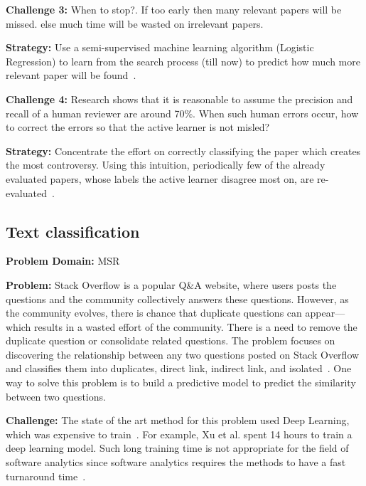 \documentclass[sigconf,anonymous,review]{acmart}
\begin{document}
\vspace{1.0ex}
\noindent\textbf{Challenge 3: }
When to stop?. If too early then   many   relevant papers will be missed.
else much time will be wasted on irrelevant papers. 

\noindent\textbf{Strategy: }
Use a semi-supervised machine learning algorithm (Logistic Regression) to learn from the search process (till now) to predict how much more relevant paper will be found~\cite{YuM17}. 

\vspace{1.0ex}
\noindent\textbf{Challenge 4: }
Research shows that it is reasonable to assume the precision and recall of a human reviewer are around 70\%. When such human errors occur, how to correct the errors so that the active learner is not misled?

\noindent\textbf{Strategy: }
Concentrate the effort on correctly classifying the paper which creates the most controversy. Using this intuition, periodically few of the already evaluated papers, whose labels the active learner disagree most on, are re-evaluated~\cite{YuM17}.



    \subsection{Text classification}
\noindent\textbf{Problem Domain: } MSR

\noindent\textbf{Problem: } Stack Overflow is a popular Q\&A website, where users posts the questions and the community collectively answers these questions. However, as the community evolves, there is chance that duplicate questions can appear---which results in a wasted effort of the community. There is a need to remove the duplicate question or consolidate related questions. The problem focuses on discovering the relationship between any two questions posted on Stack Overflow and classifies them into duplicates, direct link, indirect link, and isolated~\cite{fu2017easy, xu2016predicting}. One way to solve this problem is to build a predictive model to predict the similarity between two questions. 

\noindent\textbf{Challenge: } The state of the art method for this problem used Deep Learning, which was expensive to train~\cite{xu2016predicting}. For example, Xu et al. spent 14 hours to train a deep learning model. Such long training time is not appropriate for the field of software analytics since software analytics requires the methods to have a fast turnaround time~\cite{zhang2013software}.
\end{document}
